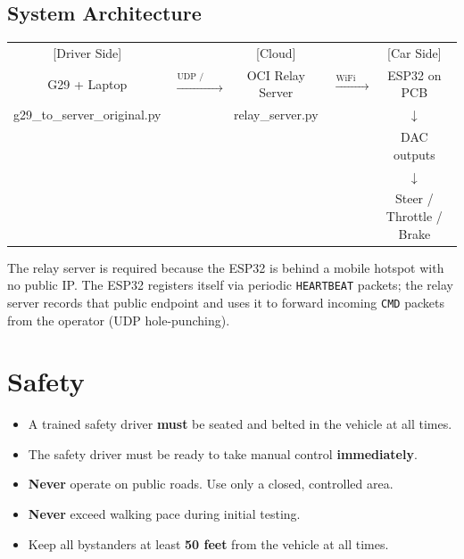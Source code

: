 ﻿\documentclass[12pt, letterpaper]{article}
\begin{document}
\subsection{System Architecture}

\begin{center}
\small\ttfamily
\begin{tabular}{ccccc}
  \textrm{[Driver Side]} &&\textrm{[Cloud]}&&\textrm{[Car Side]}\\[4pt]
  G29 + Laptop &$\xrightarrow{\text{UDP / internet}}$& OCI Relay Server
               &$\xrightarrow{\text{WiFi UDP}}$& ESP32 on PCB\\
  \small\textrm{g29\_to\_server\_original.py} && \small\textrm{relay\_server.py}
               && $\downarrow$\\
               &&&&\textrm{DAC outputs}\\
               &&&&$\downarrow$\\
               &&&&\textrm{Steer / Throttle / Brake}
\end{tabular}
\end{center}

The relay server is required because the ESP32 is behind a mobile hotspot with no
public IP.  The ESP32 registers itself via periodic \texttt{HEARTBEAT} packets;
the relay server records that public endpoint and uses it to forward incoming
\texttt{CMD} packets from the operator (UDP hole-punching).

\section{Safety}

\begin{dangerbox}
\begin{itemize}[leftmargin=*]
  \item A trained safety driver \textbf{must} be seated and belted in the vehicle at all times.
  \item The safety driver must be ready to take manual control \textbf{immediately}.
  \item \textbf{Never} operate on public roads.  Use only a closed, controlled area.
  \item \textbf{Never} exceed walking pace during initial testing.
  \item Keep all bystanders at least \textbf{50 feet} from the vehicle at all times.
\end{itemize}
\end{dangerbox}
\end{document}

